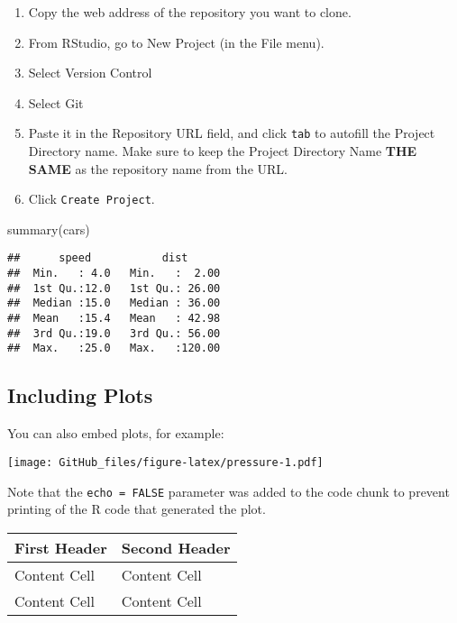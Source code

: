 \documentclass[
]{article}
\newenvironment{Shaded}{\begin{snugshade}}{\end{snugshade}}
\newcommand{\FunctionTok}[1]{\textcolor[rgb]{0.00,0.00,0.00}{#1}}
\newcommand{\NormalTok}[1]{#1}
\providecommand{\tightlist}{%
  \setlength{\itemsep}{0pt}\setlength{\parskip}{0pt}}
\begin{document}
\begin{enumerate}
  \begin{enumerate}
  \def\labelenumii{\roman{enumii}.}
  \tightlist
  \item
    Copy the web address of the repository you want to clone.
  \item
    From RStudio, go to New Project (in the File menu).
  \item
    Select Version Control
  \item
    Select Git
  \item
    Paste it in the Repository URL field, and click \texttt{tab} to
    autofill the Project Directory name. Make sure to keep the Project
    Directory Name \textbf{THE SAME} as the repository name from the
    URL.
  \item
    Click \texttt{Create\ Project}.
  \end{enumerate}
\end{enumerate}

\begin{Shaded}
\begin{Highlighting}[]
\FunctionTok{summary}\NormalTok{(cars)}
\end{Highlighting}
\end{Shaded}

\begin{verbatim}
##      speed           dist       
##  Min.   : 4.0   Min.   :  2.00  
##  1st Qu.:12.0   1st Qu.: 26.00  
##  Median :15.0   Median : 36.00  
##  Mean   :15.4   Mean   : 42.98  
##  3rd Qu.:19.0   3rd Qu.: 56.00  
##  Max.   :25.0   Max.   :120.00
\end{verbatim}

\hypertarget{including-plots}{%
\subsection{Including Plots}\label{including-plots}}

You can also embed plots, for example:

\texttt{[image: GitHub\_files/figure-latex/pressure-1.pdf]}

Note that the \texttt{echo\ =\ FALSE} parameter was added to the code
chunk to prevent printing of the R code that generated the plot.

\begin{longtable}[]{@{}ll@{}}
\toprule
First Header & Second Header \\
\midrule
\endhead
Content Cell & Content Cell \\
Content Cell & Content Cell \\
\bottomrule
\end{longtable}
\end{document}
